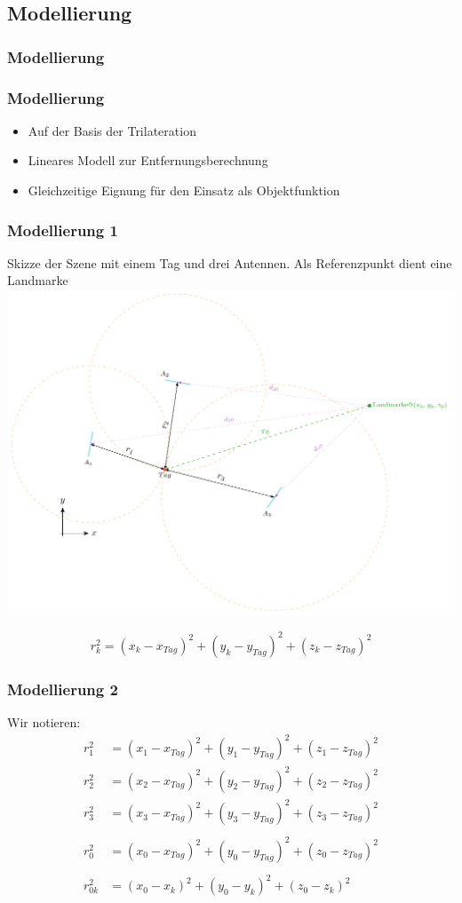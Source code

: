\subsection{Modellierung}
\begin{frame}
  \frametitle{Modellierung} %
\end{frame}
\begin{frame}
  \frametitle{Modellierung}
%
\begin{itemize} 
  \item Auf der Basis der Trilateration
  \pause 
  \item Lineares Modell zur Entfernungsberechnung
  \pause 
  \item Gleichzeitige Eignung für den Einsatz als Objektfunktion
\end{itemize} 
	
%
\end{frame}
\begin{frame}
  \frametitle{Modellierung  1}
%
  \begin{center}
	\tiny Skizze der Szene mit einem Tag und drei Antennen. Als Referenzpunkt dient eine Landmarke
%
  	\includegraphics[width=.7\textwidth]{../img/trilaterationScene.pdf}
  \end{center}
\[
r_k^2= (x_k-x_{Tag} )^2 + (y_k-y_{Tag} )^2 + (z_k-z_{Tag} )^2
\]
\end{frame}
\begin{frame}
  	\frametitle{Modellierung 2}
%  
	Wir notieren:
%	
	\begin{align}
		r_1^2&= (x_1-x_{Tag} )^2 + (y_1-y_{Tag} )^2 + (z_1-z_{Tag} )^2\\
		r_2^2&= (x_2-x_{Tag} )^2 + (y_2-y_{Tag} )^2 + (z_2-z_{Tag} )^2\\
		r_3^2&= (x_3-x_{Tag} )^2 + (y_3-y_{Tag} )^2 + (z_3-z_{Tag} )^2\\
		\nonumber\\
		r_0^2&= (x_0-x_{Tag} )^2 + (y_0-y_{Tag} )^2 + (z_0-z_{Tag} )^2\\
		\nonumber\\
		r_{0k}^2&= (x_0-x_k )^2 + (y_0-y_k )^2 + (z_0-z_k )^2
	\end{align}
%
\end{frame}
